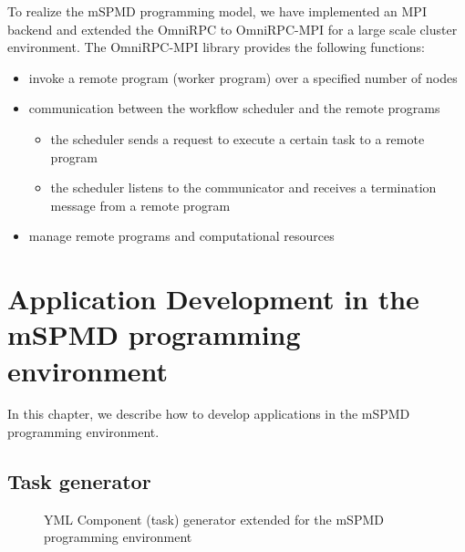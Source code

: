 \documentclass[graybox]{svmult}
\begin{document}
To realize the mSPMD programming model, we have implemented an MPI backend and extended the OmniRPC to OmniRPC-MPI for a large scale cluster environment.  
The OmniRPC-MPI library provides the following functions:
\begin{itemize}
 \item invoke a remote program (worker program) over a specified number of nodes
 \item communication between the workflow scheduler and the remote programs
       \begin{itemize}
	\item the scheduler sends a request to execute a certain task to a remote program
	\item the scheduler listens to the communicator and receives a termination message from a remote program
       \end{itemize}
 \item manage remote programs and computational resources
\end{itemize}

\section{Application Development in the mSPMD programming environment}

In this chapter, we describe how to develop applications in the mSPMD programming environment. 

\subsection{Task generator}

\begin{figure}[t]
 \begin{center}
  \caption{YML Component (task) generator extended for the mSPMD programming environment}
  \label{figure:task-generator}
 \end{center}
\end{figure}
\end{document}
